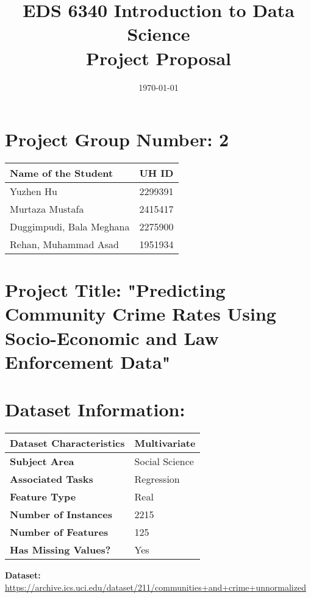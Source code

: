\documentclass{article}
\begin{document}
\title{EDS 6340 Introduction to Data Science \\  Project Proposal}
\author{}
\date{\today}
\maketitle

\section*{Project Group Number: 2}
\begin{tabular}{|l|l|}
\hline
\textbf{Name of the Student} & \textbf{UH ID} \\ \hline
Yuzhen Hu & 2299391\\ \hline
Murtaza Mustafa & 2415417 \\ \hline
Duggimpudi, Bala Meghana & 2275900\\ \hline
Rehan, Muhammad Asad & 1951934\\ \hline

\end{tabular}

\section*{Project Title: "Predicting Community Crime Rates Using Socio-Economic and Law Enforcement Data"}

\section*{Dataset Information:}

\begin{tabular}{|l|l|}
\hline
\textbf{Dataset Characteristics} & Multivariate \\ \hline
\textbf{Subject Area} & Social Science\\ \hline
\textbf{Associated Tasks} & Regression \\ \hline
\textbf{Feature Type} & Real \\ \hline
\textbf{Number of Instances} & 2215 \\ \hline
\textbf{Number of Features} & 125 \\ \hline
\textbf{Has Missing Values?} & Yes \\ \hline
\end{tabular}

\noindent \textbf{Dataset:} \url{https://archive.ics.uci.edu/dataset/211/communities+and+crime+unnormalized}
\end{document}
